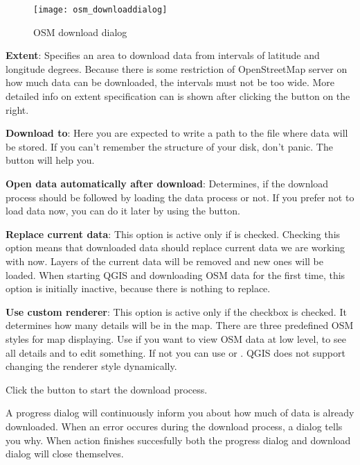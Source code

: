 \begin{figure}[ht]
   \centering
   \caption{OSM download dialog \nixcaption}\label{fig:osmdownload}\smallskip
   \texttt{[image: osm\_downloaddialog]}
\end{figure}

\begin{description}
\item \textbf{Extent}: Specifies an area to download data from intervals 
of latitude and longitude degrees. Because there is some restriction of 
OpenStreetMap server on how much data can be downloaded, the intervals 
must not be too wide. More detailed info on extent specification can is 
shown after clicking the  button on 
the right.
\item \textbf{Download to}: Here you are expected to write a path to the 
file where data will be stored. If you can't remember the structure of 
your disk, don't panic. The  button will help you.
\item \textbf{Open data automatically after download}: Determines, if the 
download process should be followed by loading the data process or not. If you 
prefer not to load data now, you can do it later by using 
the  button.
\item \textbf{Replace current data}: This option is active only if 
 is checked. 
Checking this option means that downloaded data should replace
current data we are working with now. Layers of the current data will be 
removed and new ones will be loaded. When starting QGIS and downloading 
OSM data for the first time, this option is initially inactive, because 
there is nothing to replace.
\item \textbf{Use custom renderer}: This option is active only if the 
 checkbox is checked. 
It determines how many details will be in the map. There are three predefined 
OSM styles for map displaying. Use  if you want to view 
OSM data at low level, to see all details and to edit something. If not you 
can use  or . QGIS \CURRENT does 
not support changing the renderer style dynamically.
\end{description}

Click the  button to start the download process.

A progress dialog will continuously inform you about how much of data is
already downloaded. When an error occures during the download process, a 
dialog tells you why. When action finishes succesfully both the progress dialog
and download dialog will close themselves.

